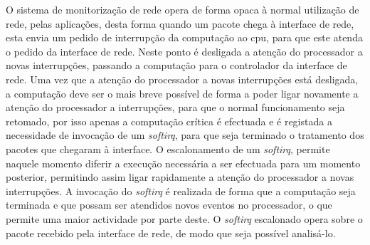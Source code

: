 







O sistema de monitorização de rede opera de forma opaca à normal utilização de rede, pelas aplicações, desta forma quando um pacote chega à interface de rede, esta envia um pedido de interrupção da computação ao cpu, para que este atenda o pedido da interface de rede.
Neste ponto é desligada a atenção do processador a novas interrupções, passando a computação para o controlador da interface de rede.
Uma vez que a atenção do processador a novas interrupções está desligada, a computação deve ser o mais breve possível de forma a poder ligar novamente a atenção do processador a interrupções, para que o normal funcionamento seja retomado, por isso apenas a computação crítica é efectuada e é registada a necessidade de invocação de um \textit{softirq}, para que seja terminado o tratamento dos pacotes que chegaram à interface.
O escalonamento de um \textit{softirq}, permite naquele momento diferir a execução necessária a ser efectuada para um momento posterior, permitindo assim ligar rapidamente a atenção do processador a novas interrupções.
A invocação do \textit{softirq} é realizada de forma que a computação seja terminada e que possam ser atendidos novos eventos no processador, o que permite uma maior actividade por parte deste.
O \textit{softirq} escalonado opera sobre o pacote recebido pela interface de rede, de modo que seja possível analisá-lo.

